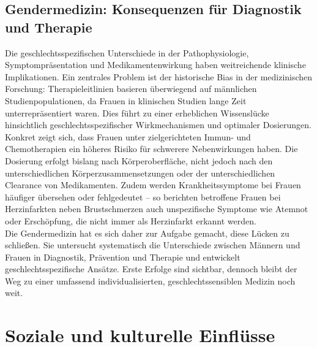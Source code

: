 \documentclass[12pt,a4paper]{article}
\begin{document}
	\subsection{Gendermedizin: Konsequenzen für Diagnostik und Therapie}
	Die geschlechtsspezifischen Unterschiede in der Pathophysiologie, Symptompräsentation und Medikamentenwirkung haben weitreichende klinische Implikationen. Ein zentrales Problem ist der historische Bias in der medizinischen Forschung: Therapieleitlinien basieren überwiegend auf männlichen Studienpopulationen, da Frauen in klinischen Studien lange Zeit unterrepräsentiert waren. \cite{NatureDiseases2024} Dies führt zu einer erheblichen Wissenslücke hinsichtlich geschlechtsspezifischer Wirkmechanismen und optimaler Dosierungen.\\
	Konkret zeigt sich, dass Frauen unter zielgerichteten Immun- und Chemotherapien ein höheres Risiko für schwerere Nebenwirkungen haben. \cite{Hasenburg2025} Die Dosierung erfolgt bislang nach Körperoberfläche, nicht jedoch nach den unterschiedlichen Körperzusammensetzungen oder der unterschiedlichen Clearance von Medikamenten. Zudem werden Krankheitssymptome bei Frauen häufiger übersehen oder fehlgedeutet -- so berichten betroffene Frauen bei Herzinfarkten neben Brustschmerzen auch unspezifische Symptome wie Atemnot oder Erschöpfung, die nicht immer als Herzinfarkt erkannt werden. \cite{ClinicBarcelona2025}\\
	Die Gendermedizin hat es sich daher zur Aufgabe gemacht, diese Lücken zu schließen. Sie untersucht systematisch die Unterschiede zwischen Männern und Frauen in Diagnostik, Prävention und Therapie und entwickelt geschlechtsspezifische Ansätze. \cite{BMWFW2025} Erste Erfolge sind sichtbar, dennoch bleibt der Weg zu einer umfassend individualisierten, geschlechtssensiblen Medizin noch weit.
	
	\section{Soziale und kulturelle Einflüsse}
\end{document}
